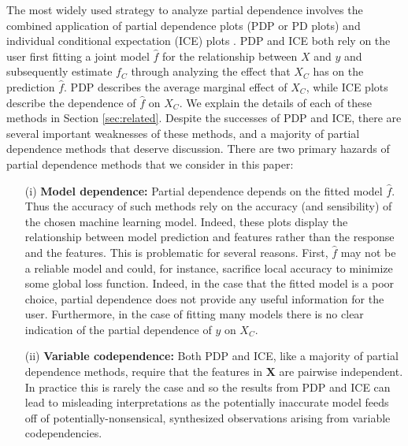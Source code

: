 \documentclass[12pt]{article}
\newcommand{\cut}[1]{}
\begin{document}
The most widely used strategy to analyze partial dependence involves the combined application of partial dependence plots (PDP or PD plots) \citep{PDP} and individual conditional expectation (ICE) plots \citep{ICE}. PDP and ICE both rely on the user first fitting a joint model $\widehat{f}$ for the relationship between $X$ and $y$ and subsequently estimate $f_C$ through analyzing the effect that $X_C$ has on the prediction $\widehat{f}$. PDP describes the average marginal effect of $X_C$, while ICE plots describe the dependence of $\widehat{f}$ on $X_C$. We explain the details of each of these methods in Section \ref{sec:related}. Despite the successes of PDP and ICE, there are several important weaknesses of these methods, and a majority of partial dependence methods that deserve discussion. There are two primary hazards of partial dependence methods that we consider in this paper: 
\begin{itemize}
	\item[(i)] {\bf Model dependence:} Partial dependence depends on the fitted model $\widehat{f}$. Thus the accuracy of such methods rely on the accuracy (and sensibility) of the chosen machine learning model. Indeed, these plots display the relationship between model prediction and features rather than the response and the features. \cut{PDP and ICE, like a majority of partial dependence strategies, are strongly affected by the model chosen by the programmer.} This is problematic for several reasons. First, $\widehat{f}$ may not be a reliable model and could, for instance, sacrifice local accuracy to minimize some global loss function. Indeed, in the case that the fitted model is a poor choice, partial dependence does not provide any useful information for the user. Furthermore, in the case of fitting many models there is no clear indication of the partial dependence of $y$ on $X_C$.
	\item[(ii)] {\bf Variable codependence:} Both PDP and ICE, like a majority of partial dependence methods, require that the features in $\mathbf{X}$ are pairwise independent. In practice this is rarely the case and so the results from PDP and ICE can lead to misleading interpretations as the potentially inaccurate model feeds off of potentially-nonsensical, synthesized observations arising from variable codependencies.  
\end{itemize}
\end{document}
